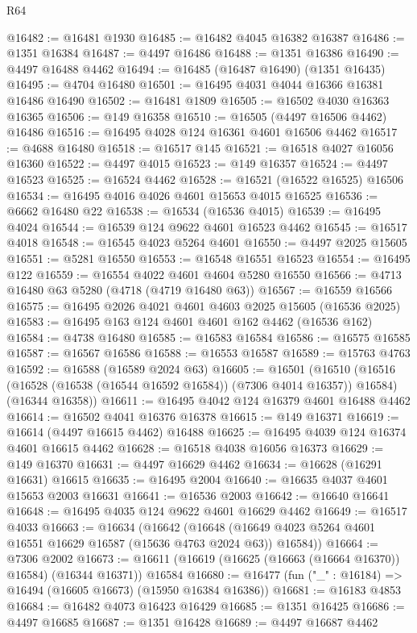\begin{lexlean}{R64}
\begin{coremodule}
@16482 := @16481 @1930
@16485 := @16482 @4045 @16382 @16387
@16486 := @1351 @16384
@16487 := @4497 @16486
@16488 := @1351 @16386
@16490 := @4497 @16488 @4462
@16494 := @16485 (@16487 @16490) (@1351 @16435)
@16495 := @4704 @16480
@16501 := @16495 @4031 @4044 @16366 @16381 @16486 @16490
@16502 := @16481 @1809
@16505 := @16502 @4030 @16363 @16365
@16506 := @149 @16358
@16510 := @16505 (@4497 @16506 @4462) @16486
@16516 := @16495 @4028 @124 @16361 @4601 @16506 @4462
@16517 := @4688 @16480
@16518 := @16517 @145
@16521 := @16518 @4027 @16056 @16360
@16522 := @4497 @4015
@16523 := @149 @16357
@16524 := @4497 @16523
@16525 := @16524 @4462
@16528 := @16521 (@16522 @16525) @16506
@16534 := @16495 @4016 @4026 @4601 @15653 @4015 @16525
@16536 := @6662 @16480 @22
@16538 := @16534 (@16536 @4015)
@16539 := @16495 @4024
@16544 := @16539 @124 @9622 @4601 @16523 @4462
@16545 := @16517 @4018
@16548 := @16545 @4023 @5264 @4601
@16550 := @4497 @2025 @15605
@16551 := @5281 @16550
@16553 := @16548 @16551 @16523
@16554 := @16495 @122
@16559 := @16554 @4022 @4601 @4604 @5280 @16550
@16566 := @4713 @16480 @63 @5280 (@4718 (@4719 @16480 @63))
@16567 := @16559 @16566
@16575 := @16495 @2026 @4021 @4601 @4603 @2025 @15605 (@16536 @2025)
@16583 := @16495 @163 @124 @4601 @4601 @162 @4462 (@16536 @162)
@16584 := @4738 @16480
@16585 := @16583 @16584
@16586 := @16575 @16585
@16587 := @16567 @16586
@16588 := @16553 @16587
@16589 := @15763 @4763
@16592 := @16588 (@16589 @2024 @63)
@16605 := @16501
    (@16510
      (@16516 (@16528 (@16538 (@16544 @16592 @16584)) (@7306 @4014 @16357)) @16584)
      (@16344 @16358))
@16611 := @16495 @4042 @124 @16379 @4601 @16488 @4462
@16614 := @16502 @4041 @16376 @16378
@16615 := @149 @16371
@16619 := @16614 (@4497 @16615 @4462) @16488
@16625 := @16495 @4039 @124 @16374 @4601 @16615 @4462
@16628 := @16518 @4038 @16056 @16373
@16629 := @149 @16370
@16631 := @4497 @16629 @4462
@16634 := @16628 (@16291 @16631) @16615
@16635 := @16495 @2004
@16640 := @16635 @4037 @4601 @15653 @2003 @16631
@16641 := @16536 @2003
@16642 := @16640 @16641
@16648 := @16495 @4035 @124 @9622 @4601 @16629 @4462
@16649 := @16517 @4033
@16663 := @16634
    (@16642
      (@16648 (@16649 @4023 @5264 @4601 @16551 @16629 @16587 (@15636 @4763 @2024 @63)) @16584))
@16664 := @7306 @2002
@16673 := @16611 (@16619 (@16625 (@16663 (@16664 @16370)) @16584) (@16344 @16371)) @16584
@16680 := @16477 (fun ("_" : @16184) => @16494 (@16605 @16673) (@15950 @16384 @16386))
@16681 := @16183 @4853
@16684 := @16482 @4073 @16423 @16429
@16685 := @1351 @16425
@16686 := @4497 @16685
@16687 := @1351 @16428
@16689 := @4497 @16687 @4462

\end{coremodule}
\end{lexlean}
